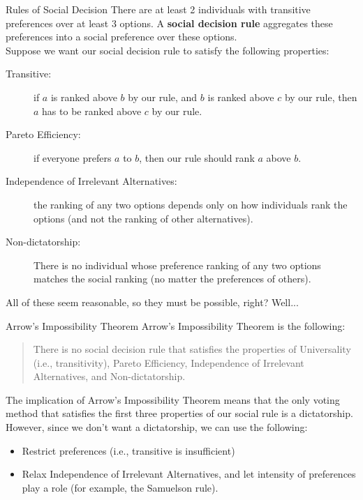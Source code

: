 \documentclass[10pt]{extarticle}
\begin{document}
  \begin{problem}{Rules of Social Decision}
    There are at least 2 individuals with transitive preferences over at least $3$ options. A \textbf{social decision rule} aggregates these preferences into a social preference over these options.\\

    Suppose we want our social decision rule to satisfy the following properties:
    \begin{description}
      \item[Transitive:] if $a$ is ranked above $b$ by our rule, and $b$ is ranked above $c$ by our rule, then $a$ has to be ranked above $c$ by our rule.
      \item[Pareto Efficiency:] if everyone prefers $a$ to $b$, then our rule should rank $a$ above $b$.
      \item[Independence of Irrelevant Alternatives:] the ranking of any two options depends only on how individuals rank the options (and not the ranking of other alternatives).
      \item[Non-dictatorship:] There is no individual whose preference ranking of any two options matches the social ranking (no matter the preferences of others).
    \end{description}
    All of these seem reasonable, so they must be possible, right? Well...
  \end{problem}
  \begin{problem}{Arrow's Impossibility Theorem}
    Arrow's Impossibility Theorem is the following:
    \begin{quote}
        There is no social decision rule that satisfies the properties of Universality (i.e., transitivity), Pareto Efficiency, Independence of Irrelevant Alternatives, and Non-dictatorship.
    \end{quote}
    The implication of Arrow's Impossibility Theorem means that the only voting method that satisfies the first three properties of our social rule is a dictatorship. However, since we don't want a dictatorship, we can use the following:
    \begin{itemize}
      \item Restrict preferences (i.e., transitive is insufficient)
      \item Relax Independence of Irrelevant Alternatives, and let intensity of preferences play a role (for example, the Samuelson rule).
    \end{itemize}
  \end{problem}
\end{document}

